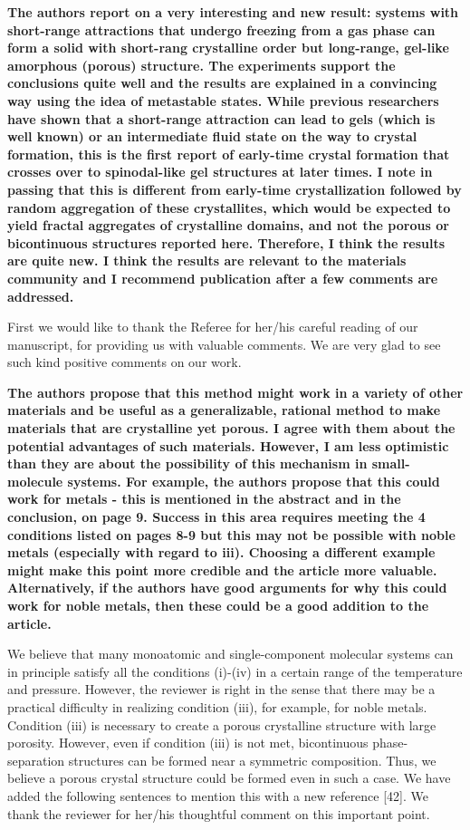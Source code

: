 \documentclass[11pt,a4paper]{article}
\newenvironment{referee}%
{\bigskip\singlespacing\bf}%
{\par\bigskip}
\begin{document}
\begin{referee}
The authors report on a very interesting and new result: systems with short-range attractions that undergo freezing from a gas phase can form a solid with short-rang crystalline order but long-range, gel-like amorphous (porous) structure. The experiments support the conclusions quite well and the results are explained in a convincing way using the idea of metastable states. While previous researchers have shown that a short-range attraction can lead to gels (which is well known) or an intermediate fluid state on the way to crystal formation, this is the first report of early-time crystal formation that crosses over to spinodal-like gel structures at later times. I note in passing that this is different from early-time crystallization followed by random aggregation of these crystallites, which would be expected to yield fractal aggregates of crystalline domains, and not the porous or bicontinuous structures reported here. Therefore, I think the results are quite new. I think the results are relevant to the 
materials community and I recommend publication after a few comments are addressed.
\end{referee}

First we would like to thank the Referee for her/his careful reading of our manuscript, for providing us with valuable comments. We are very glad to see such kind positive comments on our work.


\begin{referee}
The authors propose that this method might work in a variety of other materials and be useful as a generalizable, rational method to make materials that are crystalline yet porous. I agree with them about the potential advantages of such materials. However, I am less optimistic than they are about the possibility of this mechanism in small-molecule systems. For example, the authors propose that this could work for metals - this is mentioned in the abstract and in the conclusion, on page 9. Success in this area requires meeting the 4 conditions listed on pages 8-9 but this may not be possible with noble metals (especially with regard to iii). Choosing a different example might make this point more credible and the article more valuable. Alternatively, if the authors have good arguments for why this could work for noble metals, then these could be a good addition to the article.
\end{referee}

We believe that many monoatomic and single-component molecular systems can in principle satisfy all the conditions (i)-(iv) in a certain range of the temperature and pressure. However, the reviewer 
is right in the sense that there may be a practical difficulty in realizing condition (iii), for example, for noble metals. 
Condition (iii) is necessary to create a porous crystalline structure with large porosity. However, even if condition (iii) is not met, bicontinuous phase-separation structures 
can be formed near a symmetric composition. Thus, we believe a porous crystal structure could be formed even in such a case. We have added the following sentences to mention this 
with a new reference [42]. 
We thank the reviewer for her/his thoughtful comment on this important point.  
\end{document}

